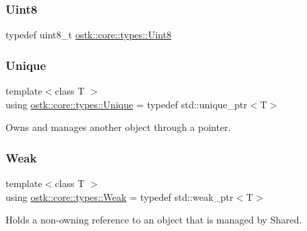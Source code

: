 \mbox{\label{namespaceostk_1_1core_1_1types_a46cad24446bacb3f8bf605a53671ab24}} 
\subsubsection{\texorpdfstring{Uint8}{Uint8}}
{\footnotesize\ttfamily typedef uint8\+\_\+t \hyperlink{namespaceostk_1_1core_1_1types_a46cad24446bacb3f8bf605a53671ab24}{ostk\+::core\+::types\+::\+Uint8}}

\mbox{\label{namespaceostk_1_1core_1_1types_a0ff1c5e84c7c42c929044b1be97ba680}} 
\subsubsection{\texorpdfstring{Unique}{Unique}}
{\footnotesize\ttfamily template$<$class T $>$ \\
using \hyperlink{namespaceostk_1_1core_1_1types_a0ff1c5e84c7c42c929044b1be97ba680}{ostk\+::core\+::types\+::\+Unique} = typedef std\+::unique\+\_\+ptr$<$T$>$}



Owns and manages another object through a pointer. 

\mbox{\label{namespaceostk_1_1core_1_1types_a0dd80951dd3139e43b5c0b3e5928d08a}} 
\subsubsection{\texorpdfstring{Weak}{Weak}}
{\footnotesize\ttfamily template$<$class T $>$ \\
using \hyperlink{namespaceostk_1_1core_1_1types_a0dd80951dd3139e43b5c0b3e5928d08a}{ostk\+::core\+::types\+::\+Weak} = typedef std\+::weak\+\_\+ptr$<$T$>$}



Holds a non-\/owning reference to an object that is managed by Shared. 



